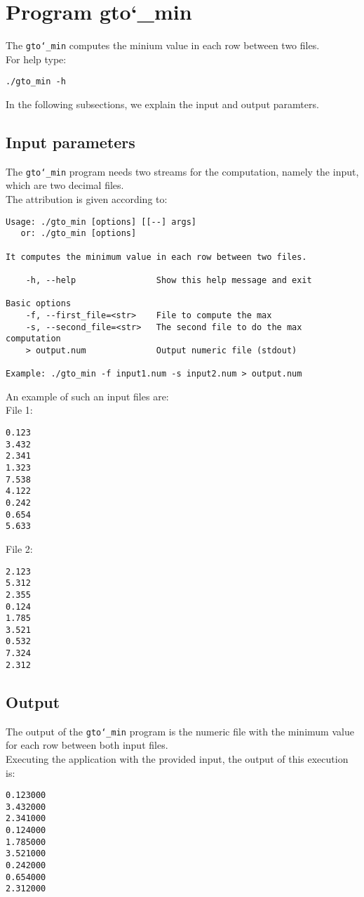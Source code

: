 \section{Program gto\char`_min}
The \texttt{gto\char`_min} computes the minium value in each row between two files.\\
For help type:
\begin{lstlisting}
./gto_min -h
\end{lstlisting}
In the following subsections, we explain the input and output paramters.

\subsection*{Input parameters}

The \texttt{gto\char`_min} program needs two streams for the computation, namely the input, which are two decimal files.\\
The attribution is given according to:
\begin{lstlisting}
Usage: ./gto_min [options] [[--] args]
   or: ./gto_min [options]

It computes the minimum value in each row between two files.

    -h, --help                Show this help message and exit

Basic options
    -f, --first_file=<str>    File to compute the max
    -s, --second_file=<str>   The second file to do the max computation
    > output.num              Output numeric file (stdout)

Example: ./gto_min -f input1.num -s input2.num > output.num
\end{lstlisting}
An example of such an input files are:\\
File 1:
\begin{lstlisting}
0.123
3.432
2.341
1.323
7.538
4.122
0.242
0.654
5.633
\end{lstlisting}
File 2:
\begin{lstlisting}
2.123
5.312
2.355
0.124
1.785
3.521
0.532
7.324
2.312
\end{lstlisting}

\subsection*{Output}
The output of the \texttt{gto\char`_min} program is the numeric file with the minimum value for each row between both input files.\\
Executing the application with the provided input, the output of this execution is:
\begin{lstlisting}
0.123000
3.432000
2.341000
0.124000
1.785000
3.521000
0.242000
0.654000
2.312000
\end{lstlisting}